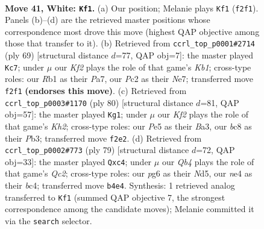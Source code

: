 \documentclass[11pt]{article}
\begin{document}
\clearpage

\begin{figure}[p]\centering
\begin{subfigure}{0.46\textwidth}\centering
\resizebox{\linewidth}{!}{%
\newchessgame
\chessboard[
  setfen={2b3k1/1qr2p1p/6p1/1B2Pp2/pQ2nP2/7N/P1P2KPP/1R6 w - - 18 41},
  showmover=false,
  pgfstyle=straightmove, color=movearrow, markmove={f2-f1}
]}
\caption{}
\end{subfigure}\hfill
\begin{subfigure}{0.46\textwidth}\centering
\resizebox{\linewidth}{!}{%
\newchessgame
\chessboard[
  setfen={1k6/p3np2/Pp6/1Prpb3/1Q1N2p1/4P1P1/5P1q/1R2KB2 b - - 2 35},
  showmover=false,
  pgfstyle=straightmove, color=movearrow, markmove={b8-c7}
]}
\caption{}
\end{subfigure}
\\[4pt]
\begin{subfigure}{0.46\textwidth}\centering
\resizebox{\linewidth}{!}{%
\newchessgame
\chessboard[
  setfen={6k1/2q2pp1/1p2rb1p/p2Q4/P3n3/BP2RN1P/5PPK/8 w - - 2 41},
  showmover=false,
  pgfstyle=straightmove, color=movearrow, markmove={h2-g1}
]}
\caption{}
\end{subfigure}\hfill
\begin{subfigure}{0.46\textwidth}\centering
\resizebox{\linewidth}{!}{%
\newchessgame
\chessboard[
  setfen={3r1k2/ppq2b1Q/4pp2/1P1n4/2BPRP1N/P6P/6PK/8 b - - 0 40},
  showmover=false,
  pgfstyle=straightmove, color=movearrow, markmove={c7-c4}
]}
\caption{}
\end{subfigure}
\caption{\textbf{Move 41, White: \texttt{Kf1}.} (a) Our position; Melanie plays \texttt{Kf1} (\texttt{f2f1}). Panels (b)--(d) are the retrieved master positions whose correspondence most drove this move (highest QAP objective among those that transfer to it). (b) Retrieved from \texttt{ccrl\_top\_p0001\#2714} (ply 69) [structural distance $d$=77, QAP obj=7]: the master played \texttt{Kc7}; under $\mu$ our \emph{Kf2} plays the role of that game's \emph{Kb1}; cross-type roles: our \emph{R}b1 as their \emph{P}a7, our \emph{P}c2 as their \emph{N}e7; transferred move \texttt{f2f1} \textbf{(endorses this move)}. (c) Retrieved from \texttt{ccrl\_top\_p0003\#1170} (ply 80) [structural distance $d$=81, QAP obj=57]: the master played \texttt{Kg1}; under $\mu$ our \emph{Kf2} plays the role of that game's \emph{Kh2}; cross-type roles: our \emph{P}e5 as their \emph{B}a3, our \emph{b}c8 as their \emph{P}b3; transferred move \texttt{f2e2}. (d) Retrieved from \texttt{ccrl\_top\_p0002\#773} (ply 79) [structural distance $d$=72, QAP obj=33]: the master played \texttt{Qxc4}; under $\mu$ our \emph{Qb4} plays the role of that game's \emph{Qc2}; cross-type roles: our \emph{p}g6 as their \emph{N}d5, our \emph{n}e4 as their \emph{b}c4; transferred move \texttt{b4e4}. Synthesis: 1 retrieved analog transferred to \texttt{Kf1} (summed QAP objective 7, the strongest correspondence among the candidate moves); Melanie committed it via the \texttt{search} selector.}
\label{fig:thought-m80}
\end{figure}
\end{document}
